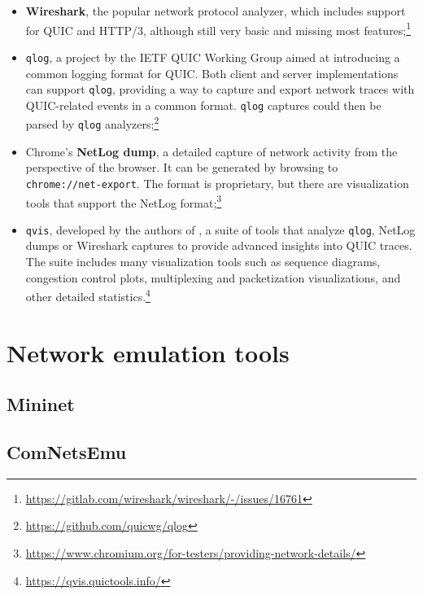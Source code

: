 \begin{itemize}
    \item \textbf{Wireshark}, the popular network protocol analyzer, which includes support for QUIC and HTTP/3, although still very basic and missing most features;\footnote{\url{https://gitlab.com/wireshark/wireshark/-/issues/16761}}
    \item \texttt{qlog}, a project by the IETF QUIC Working Group aimed at introducing a common logging format for QUIC. Both client and server implementations can support \texttt{qlog}, providing a way to capture and export network traces with QUIC-related events in a common format. \texttt{qlog} captures could then be parsed by \texttt{qlog} analyzers;\footnote{\url{https://github.com/quicwg/qlog}}
    \item Chrome's \textbf{NetLog dump}, a detailed capture of network activity from the perspective of the browser. It can be generated by browsing to \texttt{chrome://net-export}. The format is proprietary, but there are visualization tools that support the NetLog format;\footnote{\url{https://www.chromium.org/for-testers/providing-network-details/}}
    \item \texttt{qvis}, developed by the authors of \cite{quicdiversity}, a suite of tools that analyze \texttt{qlog}, NetLog dumps or Wireshark captures to provide advanced insights into QUIC traces. The suite includes many visualization tools such as sequence diagrams, congestion control plots, multiplexing and packetization visualizations, and other detailed statistics.\footnote{\url{https://qvis.quictools.info/}}
\end{itemize}

\section{Network emulation tools}
\label{sec:bg/network}


\subsection{Mininet}
\label{sec:bg/network/mininet}


\subsection{ComNetsEmu}
\label{sec:bg/network/comnetsemu}

